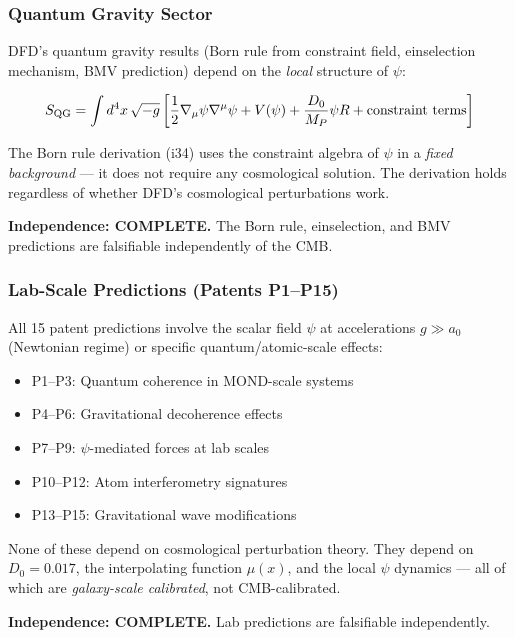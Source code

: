 \documentclass[11pt,a4paper]{article}
\begin{document}
\subsubsection{Quantum Gravity Sector}

DFD's quantum gravity results (Born rule from constraint field, einselection mechanism, BMV prediction) depend on the \emph{local} structure of $\psi$:

\begin{equation}
S_{\rm QG} = \int d^4x\,\sqrt{-g}\left[\frac{1}{2}\nabla_\mu\psi\nabla^\mu\psi + V(\psi) + \frac{D_0}{M_P}\psi R + \text{constraint terms}\right]
\end{equation}

The Born rule derivation (i34) uses the constraint algebra of $\psi$ in a \emph{fixed background} --- it does not require any cosmological solution. The derivation holds regardless of whether DFD's cosmological perturbations work.

\textbf{Independence: COMPLETE.} The Born rule, einselection, and BMV predictions are falsifiable independently of the CMB.

\subsubsection{Lab-Scale Predictions (Patents P1--P15)}

All 15 patent predictions involve the scalar field $\psi$ at accelerations $g \gg a_0$ (Newtonian regime) or specific quantum/atomic-scale effects:

\begin{itemize}
\item P1--P3: Quantum coherence in MOND-scale systems
\item P4--P6: Gravitational decoherence effects
\item P7--P9: $\psi$-mediated forces at lab scales
\item P10--P12: Atom interferometry signatures
\item P13--P15: Gravitational wave modifications
\end{itemize}

None of these depend on cosmological perturbation theory. They depend on $D_0 = 0.017$, the interpolating function $\mu(x)$, and the local $\psi$ dynamics --- all of which are \emph{galaxy-scale calibrated}, not CMB-calibrated.

\textbf{Independence: COMPLETE.} Lab predictions are falsifiable independently.
\end{document}
